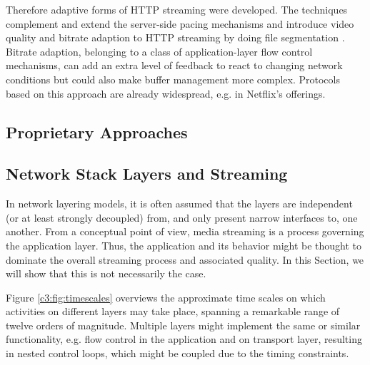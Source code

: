Therefore adaptive forms of HTTP streaming were developed. The techniques complement and extend the server-side pacing mechanisms and introduce video quality and bitrate adaption to HTTP streaming by doing file segmentation \cite{ma2011mobile, watching-video1}. Bitrate adaption, belonging to a class of application-layer flow control mechanisms, can add an extra level of feedback to react to changing network conditions but could also make buffer management more complex. Protocols based on this approach are already widespread, e.g. in Netflix's offerings.



\subsection{Proprietary Approaches}






\subsection{Network Stack Layers and Streaming}
\label{sec:analysis}

In network layering models, it is often assumed that the layers are independent (or at least strongly decoupled) from, and only present narrow interfaces to, one another. From a conceptual point of view, media streaming is a process governing the application layer. Thus, the application and its behavior might be thought to dominate the overall streaming process and associated quality. In this Section, we will show that this is not necessarily the case. %


Figure \ref{c3:fig:timescales} overviews the approximate time scales on which activities on different layers may take place, spanning a remarkable range of twelve orders of magnitude. Multiple layers might implement the same or similar functionality, e.g. flow control in the application and on transport layer, resulting in nested control loops, which might be coupled due to the timing constraints. 




